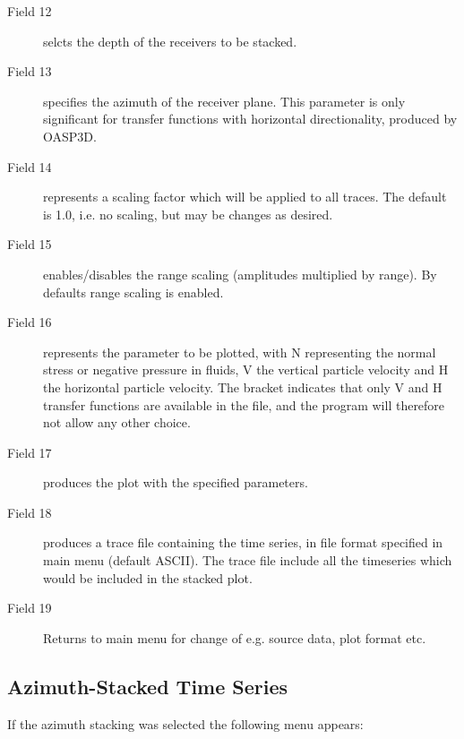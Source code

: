 \begin{description}
\item[Field 12] selcts the depth of the receivers to be stacked.
\item[Field 13] specifies the azimuth of the receiver plane. This parameter
is only significant for transfer functions with horizontal
directionality, produced by OASP3D.
\item[Field 14] represents a scaling factor which will be applied to 
          all  traces. The default is 1.0, i.e. no  scaling,  but 
          may be changes as desired.
\item[Field 15]  enables/disables  the  range  scaling   (amplitudes 
          multiplied  by  range). By defaults  range  scaling  is 
          enabled.
\item[Field 16]  represents  the  parameter to be  plotted,  with  N 
          representing the normal stress or negative pressure  in 
          fluids,  V  the vertical particle velocity  and  H  the 
          horizontal  particle  velocity. The  bracket  indicates 
          that   only  V and H  transfer   functions   are 
          available  in the file, and the program will  therefore 
          not allow any other choice.
\item[Field 17] produces the plot with the specified parameters.
\item[Field 18]  produces  a  trace file containing  the  time 
          series, in file format specified in main menu (default
          ASCII). The trace file include all the timeseries which
          would be included in the stacked plot. 
\item[Field 19] Returns to main menu for change of e.g. source data, 
          plot format etc. 
\end{description} 

\newpage
\subsection{Azimuth-Stacked Time Series}

     If the azimuth stacking was selected the following menu 
appears:

